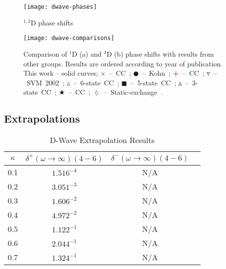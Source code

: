 \documentclass[Dissertation.tex]{subfiles}
\begin{document}


\begin{figure}[H]
	\centering
	\texttt{[image: dwave-phases]}
	\caption{$^{1,3}$D phase shifts}
	\label{fig:DWavePhase}
\end{figure}


\begin{figure}[H]
	\centering
	\texttt{[image: dwave-comparisons]}
	\caption[Comparison of D-wave phase shifts]{Comparison of $^1$D (a) and $^3$D (b) phase shifts with results from other groups. Results are ordered according to year of publication. This work -- solid curves; \mbox{\textcolor{blue}{$\times$} -- CC \cite{Walters2004};} \mbox{$\CIRCLE$ -- Kohn \cite{VanReeth2003};} \mbox{\textcolor{red}{\textbf{+}} -- CC \cite{Blackwood2002};} \mbox{$\triangledown$ -- SVM 2002 \cite{Ivanov2002};} \mbox{\textcolor{red}{$\vartriangle$} -- 6-state CC \cite{Sinha2000};} \mbox{$\blacksquare$ -- 5-state CC \cite{Adhikari1999};} \mbox{$\vartriangle$ -- 3-state CC \cite{Sinha1997};} \mbox{\textcolor[RGB]{0,127,0}{$\bigstar$} -- CC \cite{Ray1997};} \mbox{\textcolor{blue}{$\lozenge$} -- Static-exchange \cite{Hara1975}.}}
	\label{fig:DWaveComparisons}
\end{figure}


\subsection{Extrapolations}
\label{sec:DWaveExtrap}


\begin{table}[H]
\centering
\begin{tabular}{c | c c c}
\toprule
$\kappa$ & $\delta^+ (\omega \rightarrow \infty) (4-6)$ & $\delta^- (\omega \rightarrow \infty) (4-6)$  \\
\midrule
0.1 & $1.516^{-4}$ & N/A \\
0.2 & $3.051^{-3}$ & N/A \\
0.3 & $1.606^{-2}$ & N/A \\
0.4 & $4.972^{-2}$ & N/A \\
0.5 & $1.122^{-1}$ & N/A \\
0.6 & $2.044^{-1}$ & N/A \\
0.7 & $1.324^{-1}$ & N/A \\
\bottomrule
\end{tabular}
\caption{D-Wave Extrapolation Results}
\label{tab:DWaveExtrap}
\end{table}
\end{document}
